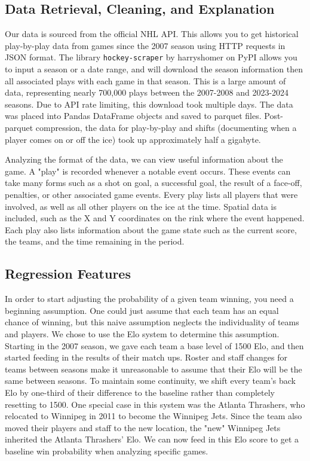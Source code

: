\documentclass{article}
\begin{document}
\subsection{Data Retrieval, Cleaning, and Explanation}
Our data is sourced from the official NHL API.
This allows you to get historical play-by-play data from games since the 2007 season using HTTP requests in JSON format.
The library \texttt{hockey-scraper} by harryshomer on PyPI allows you to input a season or a date range, and will download the season information then all associated plays with each game in that season.
This is a large amount of data, representing nearly 700,000 plays between the 2007-2008 and 2023-2024 seasons.
Due to API rate limiting, this download took multiple days.
The data was placed into Pandas DataFrame objects and saved to parquet files.
Post-parquet compression, the data for play-by-play and shifts (documenting when a player comes on or off the ice) took up approximately half a gigabyte.

Analyzing the format of the data, we can view useful information about the game.
A "play" is recorded whenever a notable event occurs.
These events can take many forms such as a shot on goal, a successful goal, the result of a face-off, penalties, or other associated game events. 
Every play lists all players that were involved, as well as all other players on the ice at the time.
Spatial data is included, such as the X and Y coordinates on the rink where the event happened.
Each play also lists information about the game state such as the current score, the teams, and the time remaining in the period.

\subsection{Regression Features}
In order to start adjusting the probability of a given team winning, you need a beginning assumption.
One could just assume that each team has an equal chance of winning, but this naive assumption neglects the individuality of teams and players.
We chose to use the Elo system to determine this assumption.
Starting in the 2007 season, we gave each team a base level of 1500 Elo, and then started feeding in the results of their match ups.
Roster and staff changes for teams between seasons make it unreasonable to assume that their Elo will be the same between seasons.
To maintain some continuity, we shift every team's back Elo by one-third of their difference to the baseline rather than completely resetting to 1500.
One special case in this system was the Atlanta Thrashers, who relocated to Winnipeg in 2011 to become the Winnipeg Jets.
Since the team also moved their players and staff to the new location, the "new" Winnipeg Jets inherited the Atlanta Thrashers' Elo.
We can now feed in this Elo score to get a baseline win probability when analyzing specific games.
\end{document}
